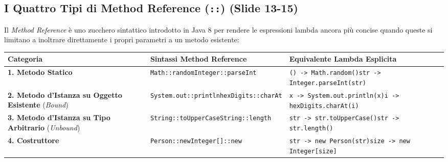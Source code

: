 \documentclass[11pt,a4paper,oneside]{report}
\newcommand{\passthrough}[1]{#1}
\begin{document}
\subsection{\texorpdfstring{I Quattro Tipi di Method Reference
(\texttt{::}) (Slide
13-15)}{I Quattro Tipi di Method Reference (::) (Slide 13-15)}}\label{chap17_i-quattro-tipi-di-method-reference-slide-13-15}

Il \emph{Method Reference} è uno zucchero sintattico introdotto in Java
8 per rendere le espressioni lambda ancora più concise quando queste si
limitano a inoltrare direttamente i propri parametri a un metodo
esistente:

\begin{longtable}[]{@{}
  >{\raggedright\arraybackslash}p{}
  >{\raggedright\arraybackslash}p{}
  >{\raggedright\arraybackslash}p{}@{}}
\toprule\noalign{}
\begin{minipage}[b]{\linewidth}\raggedright
Categoria
\end{minipage} & \begin{minipage}[b]{\linewidth}\raggedright
Sintassi Method Reference
\end{minipage} & \begin{minipage}[b]{\linewidth}\raggedright
Equivalente Lambda Esplicita
\end{minipage} \\
\midrule\noalign{}
\endhead
\bottomrule\noalign{}
\endlastfoot
\textbf{1. Metodo Statico} &
\passthrough{\lstinline!Math::random!}\passthrough{\lstinline!Integer::parseInt!}
&
\passthrough{\lstinline!() -> Math.random()!}\passthrough{\lstinline!str -> Integer.parseInt(str)!} \\
\textbf{2. Metodo d'Istanza su Oggetto Esistente} (\emph{Bound}) &
\passthrough{\lstinline!System.out::println!}\passthrough{\lstinline!hexDigits::charAt!}
&
\passthrough{\lstinline!x -> System.out.println(x)!}\passthrough{\lstinline!i -> hexDigits.charAt(i)!} \\
\textbf{3. Metodo d'Istanza su Tipo Arbitrario} (\emph{Unbound}) &
\passthrough{\lstinline!String::toUpperCase!}\passthrough{\lstinline!String::length!}
&
\passthrough{\lstinline!str -> str.toUpperCase()!}\passthrough{\lstinline!str -> str.length()!} \\
\textbf{4. Costruttore} &
\passthrough{\lstinline!Person::new!}\passthrough{\lstinline!Integer[]::new!}
&
\passthrough{\lstinline!str -> new Person(str)!}\passthrough{\lstinline!size -> new Integer[size]!} \\
\end{longtable}
\end{document}
